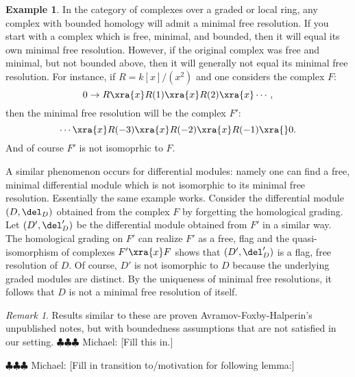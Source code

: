 \documentclass[12pt]{amsart}
\theoremstyle{definition}
\newtheorem{example}[lemma]{Example}
\theoremstyle{remark}
\newtheorem{rem}[lemma]{Remark}
\newcommand{\Tor}{\operatorname{Tor}}
\newcommand{\michael}[1]{{\color{red} \sf $\clubsuit\clubsuit\clubsuit$ Michael: [#1]}}
\begin{document}
\begin{example}
In the category of complexes over a graded or local ring, any complex with bounded homology will admit a minimal free resolution.  If you start with a complex which is free, minimal, and bounded, then it will equal its own minimal free resolution.  However, if the original complex was free and minimal, but not bounded above, then it will generally not equal its minimal free resolution.  For instance, if  $R = k[x]/(x^2)$ and one considers the complex $F$:
$$
0 \to R \xra{x} R(1) \xra{x} R(2) \xra{x} \cdots,
$$
then the minimal free resolution will be the complex $F'$:
$$
\cdots \xra{x} R(-3) \xra{x} R(-2) \xra{x} R(-1) \xra{} 0.
$$
And of course $F'$ is not isomoprhic to $F$.

A similar phenomenon occurs for differential modules: namely one can find a free, minimal differential module which is not isomorphic to its minimal free resolution.  Essentially the same example works.  Consider the differential module $(D, \del_D)$ obtained from the complex $F$ by forgetting the homological grading. Let $(D', \del_D')$ be the differential module obtained from $F'$ in a similar way.  The homological grading on $F'$ can realize $F'$ as a free, flag and the quasi-isomorphism of complexes $F'\xra{x} F$ shows that $(D', \del_D')$ is a flag, free resolution of $D$.  Of course, $D'$ is not isomorphic to $D$ because the underlying graded modules are distinct. By the uniqueness of minimal free resolutions,  it follows that $D$ is not a minimal free resolution of itself. 
\end{example}

\begin{rem}
Results similar to these are proven Avramov-Foxby-Halperin's unpublished notes, but with boundedness assumptions that are not satisfied in our setting. \michael{Fill this in.}
\end{rem}

\iffalse
\begin{example}
When $R$ is a graded algebra over a field hypotheses as above, $\Tor(M,k)$ computes
\end{example}
\fi

\michael{Fill in transition to/motivation for following lemma:}
\end{document}
